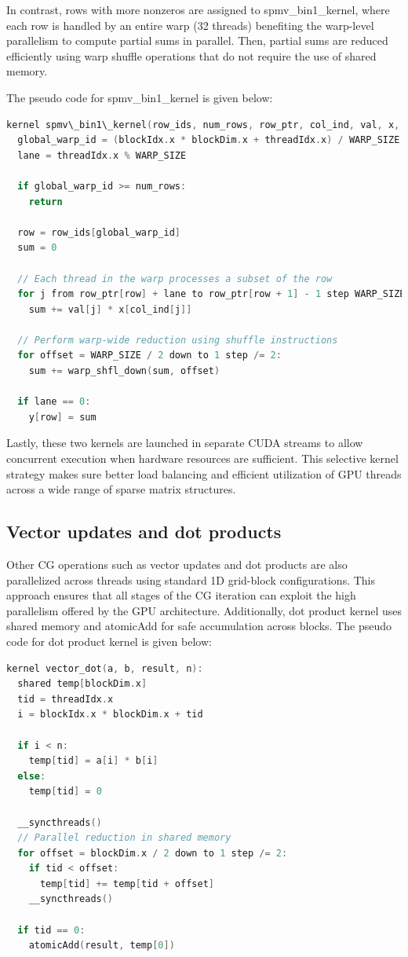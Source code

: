 \documentclass[conference]{IEEEtran}
\begin{document}
In contrast, rows with more nonzeros are assigned to spmv\_bin1\_kernel, where each row is handled by an entire warp (32 threads) benefiting the warp-level parallelism to compute partial sums in parallel. Then, partial sums are reduced efficiently using warp shuffle operations that do not require the use of shared memory.

The pseudo code for spmv\_bin1\_kernel is given below:
\begin{lstlisting}[language=C]
kernel spmv\_bin1\_kernel(row_ids, num_rows, row_ptr, col_ind, val, x, y):
  global_warp_id = (blockIdx.x * blockDim.x + threadIdx.x) / WARP_SIZE
  lane = threadIdx.x % WARP_SIZE

  if global_warp_id >= num_rows:
    return

  row = row_ids[global_warp_id]
  sum = 0

  // Each thread in the warp processes a subset of the row
  for j from row_ptr[row] + lane to row_ptr[row + 1] - 1 step WARP_SIZE:
    sum += val[j] * x[col_ind[j]]

  // Perform warp-wide reduction using shuffle instructions
  for offset = WARP_SIZE / 2 down to 1 step /= 2:
    sum += warp_shfl_down(sum, offset)

  if lane == 0:
    y[row] = sum
\end{lstlisting}

Lastly, these two kernels are launched in separate CUDA streams to allow concurrent execution when hardware resources are sufficient. This selective kernel strategy makes sure better load balancing and efficient utilization of GPU threads across a wide range of sparse matrix structures.

\subsection{Vector updates and dot products}
Other CG operations such as vector updates and dot products are also parallelized across threads using standard 1D grid-block configurations. This approach ensures that all stages of the CG iteration can exploit the high parallelism offered by the GPU architecture. Additionally, dot product kernel uses shared memory and atomicAdd for safe accumulation across blocks.
The pseudo code for dot product kernel is given below:
\begin{lstlisting}[language=C]
kernel vector_dot(a, b, result, n):
  shared temp[blockDim.x]
  tid = threadIdx.x
  i = blockIdx.x * blockDim.x + tid

  if i < n:
    temp[tid] = a[i] * b[i]
  else:
    temp[tid] = 0

  __syncthreads()
  // Parallel reduction in shared memory
  for offset = blockDim.x / 2 down to 1 step /= 2:
    if tid < offset:
      temp[tid] += temp[tid + offset]
    __syncthreads()

  if tid == 0:
    atomicAdd(result, temp[0])
\end{lstlisting}
\end{document}
